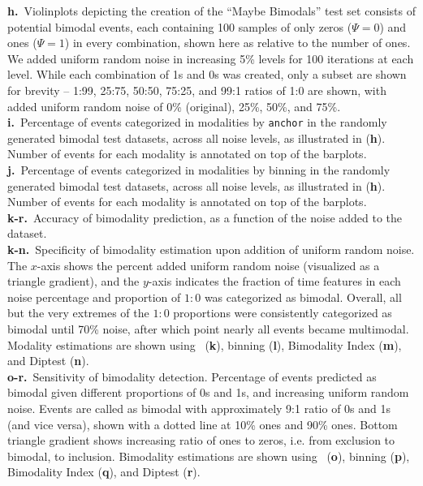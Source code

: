 \begin{minipage}{\textwidth}
\textbf{h.}~Violinplots depicting the creation of the ``Maybe Bimodals'' test set consists of potential bimodal events, each containing 100 samples of only zeros ($\Psi = 0$) and ones ($\Psi = 1$) in every combination, shown here as relative to the number of ones. We added uniform random noise in increasing 5\% levels for 100 iterations at each level. While each combination of 1s and 0s was created, only a subset are shown for brevity -- 1:99, 25:75, 50:50, 75:25, and 99:1 ratios of 1:0 are shown, with added uniform random noise of 0\% (original), 25\%, 50\%, and 75\%.\\
\textbf{i.}~Percentage of events categorized in modalities by \texttt{anchor} in the randomly generated bimodal test datasets, across all noise levels, as illustrated in (\textbf{h}). Number of events for each modality is annotated on top of the barplots. \\
\textbf{j.}~Percentage of events categorized in modalities by binning in the randomly generated bimodal test datasets, across all noise levels, as illustrated in (\textbf{h}). Number of events for each modality is annotated on top of the barplots. \\
\textbf{k-r.}~Accuracy of bimodality prediction, as a function of the noise added to the dataset. \\
\textbf{k-n.}~Specificity of bimodality estimation upon addition of uniform random noise. The $x$-axis shows the percent added uniform random noise (visualized as a triangle gradient), and the $y$-axis indicates the fraction of time features in each noise percentage and proportion of $1:0$ was categorized as bimodal. Overall, all but the very extremes of the $1:0$ proportions were consistently categorized as bimodal until 70\% noise, after which point nearly all events became multimodal. Modality estimations are shown using \anchor\, (\textbf{k}), binning (\textbf{l}), Bimodality Index (\textbf{m}), and Diptest (\textbf{n}).\\
\textbf{o-r.}~Sensitivity of bimodality detection. Percentage of events predicted as bimodal given different proportions of 0s and 1s, and increasing uniform random noise. Events are called as bimodal with approximately 9:1 ratio of 0s and 1s (and vice versa), shown with a dotted line at 10\% ones and 90\% ones. Bottom triangle gradient shows increasing ratio of ones to zeros, i.e. from exclusion to bimodal, to inclusion. Bimodality estimations are shown using \anchor\, (\textbf{o}), binning (\textbf{p}), Bimodality Index (\textbf{q}), and Diptest (\textbf{r}).\\

\end{minipage}
